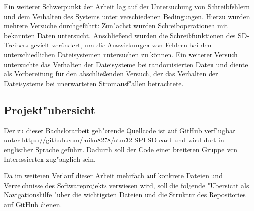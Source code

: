 \documentclass[11pt]{article}
\begin{document}
Ein weiterer Schwerpunkt der Arbeit lag auf der Untersuchung von Schreibfehlern
und dem Verhalten des Systems unter verschiedenen Bedingungen. 
Hierzu wurden mehrere Versuche durchgeführt: 
Zun"achst wurden Schreiboperationen mit bekannten Daten untersucht. 
Anschließend wurden die Schreibfunktionen des SD-Treibers gezielt verändert,
um die Auswirkungen von Fehlern bei den unterschiedlichen Dateisystemen untersuchen zu können.
Ein weiterer Versuch untersuchte das Verhalten der Dateisysteme bei randomisierten Daten
und diente als Vorbereitung für den abschließenden Versuch, 
der das Verhalten der Dateisysteme bei unerwarteten Stromausf"allen betrachtete.


\subsection{Projekt"ubersicht}
Der zu dieser Bachelorarbeit geh"orende Quellcode ist auf GitHub verf"ugbar unter \url{https://github.com/miko8278/stm32-SPI-SD-card} und wird dort in englischer Sprache geführt.
Dadurch soll der Code einer breiteren Gruppe von Interessierten zug"anglich sein.

Da im weiteren Verlauf dieser Arbeit mehrfach auf konkrete Dateien und
Verzeichnisse des Softwareprojekts verwiesen wird, soll die folgende "Ubersicht als Navigationshilfe
"uber die wichtigsten Dateien und die Struktur des Repositories auf GitHub dienen.
\end{document}
